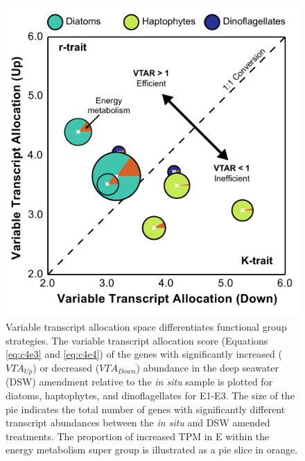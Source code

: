 \begin{figure}[h!]
  \centering
    \includegraphics[width=.8\textwidth]{Images/C4_Figure4_Final.pdf}
    \caption[Variable transcript allocation space differentiates functional group strategies]{Variable transcript allocation space differentiates functional group strategies. The variable transcript allocation score (Equations \ref{eq:c4e3} and \ref{eq:c4e4}) of the genes with significantly increased ($VTA_{Up}$) or decreased ($VTA_{Down}$) abundance in the deep seawater (DSW) amendment relative to the \textit{in situ} sample is plotted for diatoms, haptophytes, and dinoflagellates for E1-E3. The size of the pie indicates the total number of genes with significantly different transcript abundances between the \textit{in situ} and DSW amended treatments. The proportion of increased TPM in E within the energy metabolism super group is illustrated as a pie slice in orange.}
  \label{fig:c4f4}
\end{figure}



